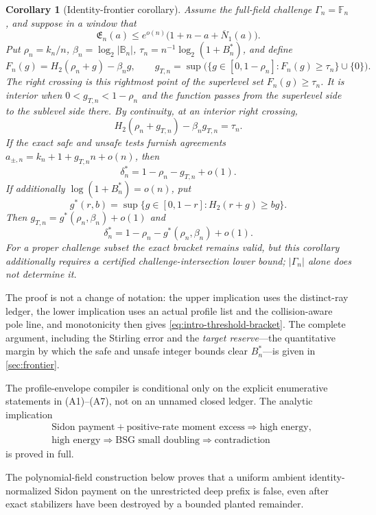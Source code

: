 \documentclass[12pt,a4paper]{amsart}
\numberwithin{equation}{section}
\newtheorem{corollary}[corollary]{Corollary}
\theoremstyle{remark}
\newcommand{\F}{\mathbb F}
\newcommand{\B}{\mathbb B}
\newcommand{\barN}{\overline N}
\begin{document}
\begin{corollary}[Identity-frontier corollary]
\label{cor:intro-identity-frontier}
Assume the full-field challenge \(\Gamma_n=\F_n\), and suppose in a
window that
\[
 \mathfrak E_n(a)\le e^{o(n)}
 \bigl(1+n-a+\barN_1(a)\bigr).
\]
Put \(\rho_n=k_n/n\), \(\beta_n=\log_2|\B_n|\),
\(\tau_n=n^{-1}\log_2(1+B_n^*)\), and
define
\[
 F_n(g)=H_2(\rho_n+g)-\beta_ng,\qquad
 g_{T,n}=\sup\bigl(\{g\in[0,1-\rho_n]:F_n(g)\ge\tau_n\}\cup\{0\}\bigr).
 \tag{1.7}\label{eq:intro-target-crossing}
\]
The \emph{right crossing} is this rightmost point of the superlevel set
\(F_n(g)\ge\tau_n\).  It is \emph{interior} when
\(0<g_{T,n}<1-\rho_n\) and the function passes from the superlevel side
to the sublevel side there.  By continuity, at an interior right crossing,
\[
 H_2(\rho_n+g_{T,n})-\beta_ng_{T,n}=\tau_n.
\]
If the exact safe and unsafe tests furnish agreements
\(a_{\pm,n}=k_n+1+g_{T,n}n+o(n)\), then
\[
 \delta_n^*=1-\rho_n-g_{T,n}+o(1).
\]
If additionally \(\log(1+B_n^*)=o(n)\), put
\[
 g^*(r,b)=\sup\{g\in[0,1-r]:H_2(r+g)\ge bg\}.
\]
Then \(g_{T,n}=g^*(\rho_n,\beta_n)+o(1)\) and
\[
 \delta_n^*
 =1-\rho_n-g^*(\rho_n,\beta_n)+o(1).              \tag{1.8}
\]
For a proper challenge subset the exact bracket remains valid, but this
corollary additionally requires a certified challenge-intersection lower
bound; \(|\Gamma_n|\) alone does not determine it.
\end{corollary}

The proof is not a change of notation: the upper implication uses the
distinct-ray ledger, the lower implication uses an actual profile list and
the collision-aware pole line, and monotonicity then gives
\eqref{eq:intro-threshold-bracket}.  The complete argument, including the
Stirling error and the \emph{target reserve}---the quantitative margin by
which the safe and unsafe integer bounds clear \(B_n^*\)---is given in
\cref{sec:frontier}.

The profile-envelope compiler is conditional only on the explicit
enumerative statements in \textup{(A1)}--\textup{(A7)}, not on an unnamed
closed ledger.  The analytic implication
\[
 \begin{aligned}
 &\text{Sidon payment}+\text{positive-rate moment excess}
   \Longrightarrow\text{high energy},\\
 &\text{high energy}\Longrightarrow\text{BSG small doubling}
   \Longrightarrow\text{contradiction}
 \end{aligned}
\]
is proved in full.

The polynomial-field construction below proves that a
uniform ambient identity-normalized Sidon payment on the unrestricted deep
prefix is false, even after
exact stabilizers have been destroyed by a bounded planted remainder.
\end{document}
